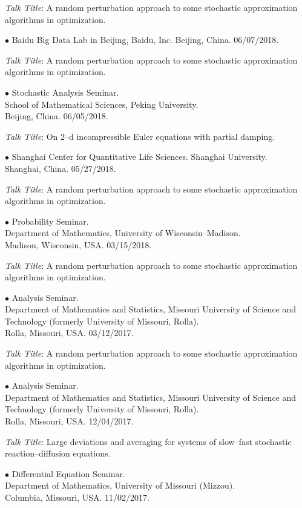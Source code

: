 \documentclass[margin,line]{res}
\begin{document}
\begin{resume}
\textit{Talk Title}: A random perturbation approach to some stochastic approximation algorithms in optimization.


{$\bullet$ Baidu Big Data Lab in Beijing, Baidu, Inc.
Beijing, China.} \hfill 06/07/2018.

\textit{Talk Title}: A random perturbation approach to some stochastic approximation algorithms in optimization.

{$\bullet$ Stochastic Analysis Seminar. \\
School of Mathematical Sciences, Peking University. \\
Beijing, China.} \hfill 06/05/2018.

\textit{Talk Title}: On 2--d incompressible Euler equations with partial damping.

{$\bullet$ Shanghai Center for Quantitative Life Sciences. Shanghai University. \\
Shanghai, China.} \hfill 05/27/2018.

\textit{Talk Title}: A random perturbation approach to some stochastic approximation algorithms in optimization.

{$\bullet$ Probability Seminar. \\
Department of Mathematics, University of Wisconsin--Madison. \\
Madison, Wisconsin, USA.} \hfill 03/15/2018.

\textit{Talk Title}: A random perturbation approach to some stochastic approximation algorithms in optimization.


{$\bullet$ Analysis Seminar. \\ Department of Mathematics and Statistics,
Missouri University of Science and Technology (formerly University of Missouri, Rolla). \\
Rolla, Missouri, USA.} \hfill 03/12/2017.

\textit{Talk Title}: A random perturbation approach to some stochastic approximation algorithms in optimization.


{$\bullet$ Analysis Seminar. \\ Department of Mathematics and Statistics,
Missouri University of Science and Technology (formerly University of Missouri, Rolla). \\
Rolla, Missouri, USA.} \hfill 12/04/2017.

\textit{Talk Title}: Large deviations and averaging for systems of slow--fast stochastic reaction--diffusion equations.


{$\bullet$ Differential Equation Seminar. \\ Department of Mathematics,
University of Missouri (Mizzou). \\
Columbia, Missouri, USA.} \hfill 11/02/2017.


\end{resume}
\end{document}
